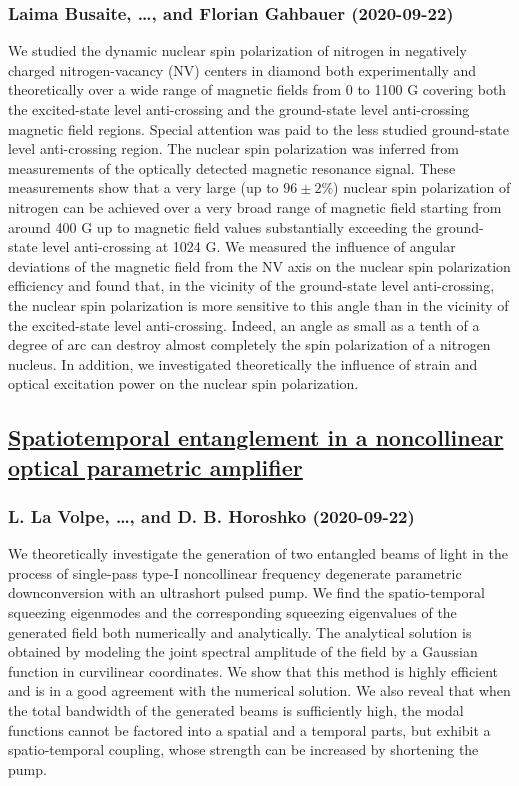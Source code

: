 {\subsubsection*{Laima Busaite, \dots, and Florian Gahbauer (2020-09-22)}
We studied the dynamic nuclear spin polarization of nitrogen in negatively
charged nitrogen-vacancy (NV) centers in diamond both experimentally and
theoretically over a wide range of magnetic fields from 0 to 1100 G covering
both the excited-state level anti-crossing and the ground-state level
anti-crossing magnetic field regions. Special attention was paid to the less
studied ground-state level anti-crossing region. The nuclear spin polarization
was inferred from measurements of the optically detected magnetic resonance
signal. These measurements show that a very large (up to $96 \pm 2\%$) nuclear
spin polarization of nitrogen can be achieved over a very broad range of
magnetic field starting from around 400 G up to magnetic field values
substantially exceeding the ground-state level anti-crossing at 1024 G. We
measured the influence of angular deviations of the magnetic field from the NV
axis on the nuclear spin polarization efficiency and found that, in the
vicinity of the ground-state level anti-crossing, the nuclear spin polarization
is more sensitive to this angle than in the vicinity of the excited-state level
anti-crossing. Indeed, an angle as small as a tenth of a degree of arc can
destroy almost completely the spin polarization of a nitrogen nucleus. In
addition, we investigated theoretically the influence of strain and optical
excitation power on the nuclear spin polarization.

\subsection*{\href{http://arxiv.org/abs/2009.10511v1}{Spatiotemporal entanglement in a noncollinear optical parametric  amplifier}}
\subsubsection*{L. La Volpe, \dots, and D. B. Horoshko (2020-09-22)}
We theoretically investigate the generation of two entangled beams of light
in the process of single-pass type-I noncollinear frequency degenerate
parametric downconversion with an ultrashort pulsed pump. We find the
spatio-temporal squeezing eigenmodes and the corresponding squeezing
eigenvalues of the generated field both numerically and analytically. The
analytical solution is obtained by modeling the joint spectral amplitude of the
field by a Gaussian function in curvilinear coordinates. We show that this
method is highly efficient and is in a good agreement with the numerical
solution. We also reveal that when the total bandwidth of the generated beams
is sufficiently high, the modal functions cannot be factored into a spatial and
a temporal parts, but exhibit a spatio-temporal coupling, whose strength can be
increased by shortening the pump.

}
